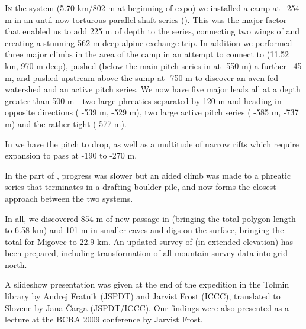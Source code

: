 \thispagestyle{endchapter}

\begin{tcolorbox}
\vspace{80pt}

\lettrine{I}{n} the  system (5.70 km/802 m at beginning of expo) we
installed a camp at --254 m in an until now torturous parallel shaft
series (). This was the major factor that enabled
us to add 225 m of depth to the  series,
connecting two wings of  and creating a stunning 562 m
deep alpine exchange trip. In addition we performed three major climbs
in the area of the camp in an attempt to connect  to
 (11.52 km, 970 m deep), pushed 
(below the main pitch series in  at -550 m) a further
--45 m, and pushed upstream above the  sump at -750 m to
discover an aven fed watershed and an active pitch series. We now have
five major leads all at a depth greater than 500 m - two large phreatics separated by 120 m and heading in opposite
directions ( -539 m,  -529 m), two
large active pitch series ( -585 m, 
-737 m) and the rather tight  (-577 m).

In  we have the  pitch to drop, as well as a multitude of narrow rifts which
require expansion to pass at -190 to -270 m.

In the  part of , progress was slower but an
aided climb was made to a phreatic series that terminates in a drafting
boulder pile, and now forms the closest approach between the two
systems.

In all, we discovered 854 m of new passage in  (bringing
the total polygon length to 6.58 km) and 101 m in smaller caves and digs
on the surface, bringing the total for Migovec to 22.9 km. An updated
survey of  (in extended elevation) has been prepared,
including transformation of all mountain survey data into grid north.

A slideshow presentation was given
at the end of the expedition in the Tolmin library by Andrej Fratnik
(JSPDT) and Jarvist Frost (ICCC), translated to Slovene by Jana Čarga
(JSPDT/ICCC). Our findings were also presented as a lecture at the BCRA
2009 conference by Jarvist Frost.

\end{tcolorbox}
\BgThispage
